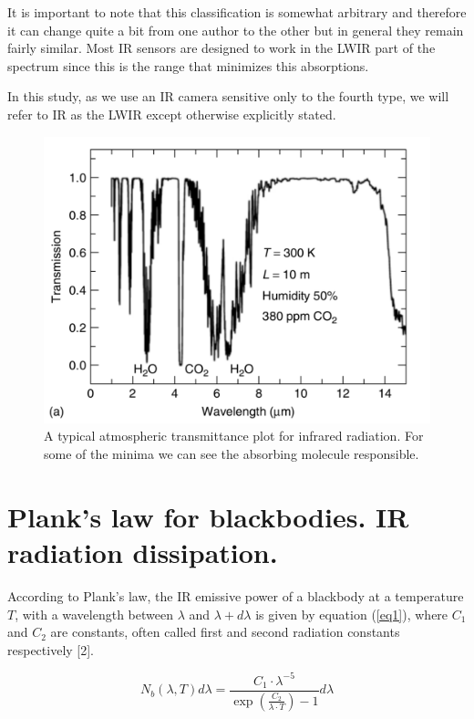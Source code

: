 		It is important to note that this classification is somewhat arbitrary and therefore it can change quite a bit from one author to the other but in general they remain fairly similar. Most IR sensors are designed to work in the LWIR part of the spectrum since this is the range that minimizes this absorptions.
		
		In this study, as we use an IR camera sensitive only to the fourth type, we will refer to IR as the LWIR except otherwise explicitly stated.
		
		\begin{figure}[ht!]
			\centering
			\captionsetup{justification=centering,margin=2cm}
			\includegraphics[scale=0.45]{Figures/Chapter01/Transmission.pdf}
			\caption{A typical atmospheric transmittance plot  for infrared radiation. For some of the minima we can see the absorbing molecule responsible.}\label{fig2}
		\end{figure}
		
	\section{Plank's law for blackbodies. IR radiation dissipation.}\label{section1.2}
	
		According to Plank's law, the IR emissive power of a blackbody at a temperature $T$, with a wavelength between $\lambda$ and $\lambda+d\lambda$ is given by equation (\ref{eq1}), where $C_{1}$ and $C_{2}$ are constants, often called first and second radiation constants respectively [2].
		
		\begin{equation}\label{eq1}
			N_{b}(\lambda,T)d\lambda=\frac{C_{1} \cdot \lambda^{-5}}{\exp (\frac{C_{2}}{\lambda\cdot T}) -1} d\lambda
		\end{equation}
		
